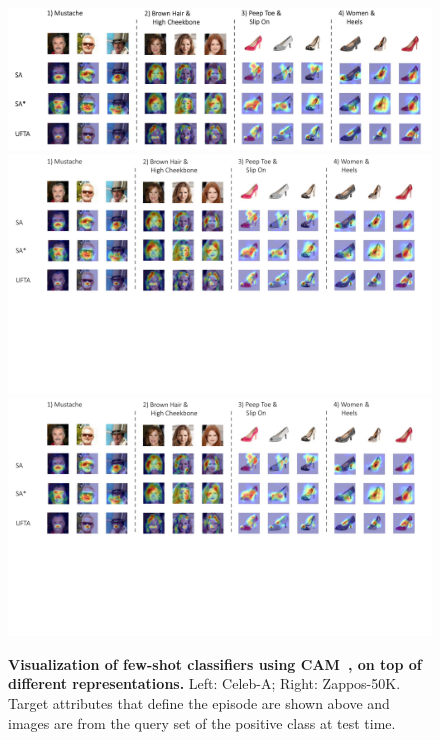 \begin{figure}[t]
\centering
\iflatexml
\includegraphics[width=6\textwidth]{figures/vis_cam_iccv.png}
\else
\ifarxiv
\includegraphics[width=\textwidth,trim={0 8cm 0
0.3cm},clip]{figures/vis_cam_iccv.pdf}
\else
\includegraphics[width=\textwidth,trim={0 8cm 0
0.3cm},clip]{figures/vis_cam_iccv.pdf}
\fi
\fi
\savespacebeforesection
\savespacebeforesection
\caption{
\textbf{Visualization of few-shot classifiers using CAM~\citep{cam}, on top of
different representations.} Left: Celeb-A; Right: Zappos-50K. Target attributes
that define the episode are shown above and images are from the query set of
the positive class at test time.}
\label{fig:viz}
\savespacebeforesection
\savespacebeforesection
\end{figure}

